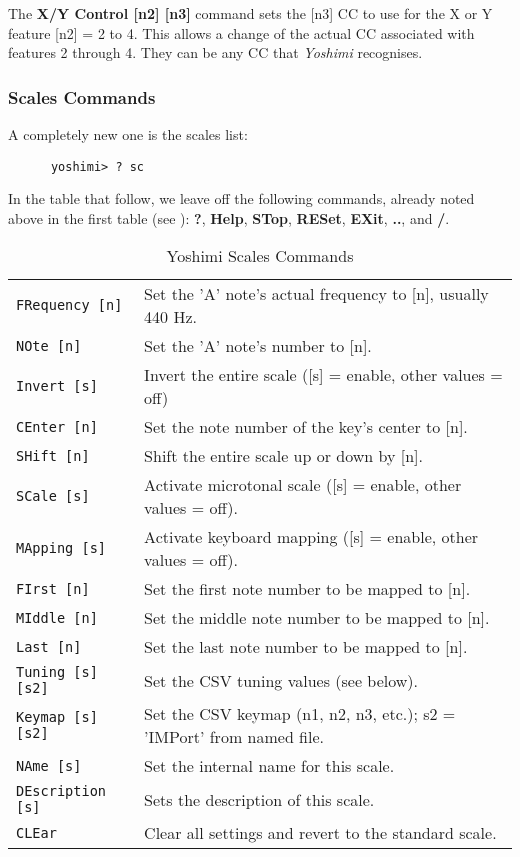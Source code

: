    The \textbf{X/Y Control [n2] [n3]} command
   sets the [n3] CC to use for the X or Y feature [n2] = 2 to 4.
   This allows a change of the actual CC associated with features 2 through 4.
   They can be any CC that \textsl{Yoshimi} recognises.

\subsubsection{Scales Commands}
\label{subsec:command_line_scales_command_list}

   A completely new one is the scales list:

   \begin{verbatim}
      yoshimi> ? sc
   \end{verbatim}

   In the table that follow, we leave off the following commands, already noted
   above in the first table
   (see ):
   \textbf{?}, \textbf{Help}, \textbf{STop}, \textbf{RESet},
   \textbf{EXit}, \textbf{..}, and \textbf{/}.

   \begin{table}[H]
      \centering
      \caption{Yoshimi Scales Commands}
      \label{table:yoshimi_text_scales_commands}
      \begin{tabular}{l l}

\texttt{FRequency [n]} &
   Set the 'A' note's actual frequency to [n], usually 440 Hz. \\
\texttt{NOte [n]} &
   Set the 'A' note's number to [n]. \\
\texttt{Invert [s]} &
   Invert the entire scale ([s] = enable, other values = off) \\
\texttt{CEnter [n]} &
   Set the note number of the key's center to [n]. \\
\texttt{SHift [n]} &
   Shift the entire scale up or down by [n]. \\
\texttt{SCale [s]} &
   Activate microtonal scale ([s] = enable, other values = off). \\
\texttt{MApping [s]} &
   Activate keyboard mapping ([s] = enable, other values = off). \\
\texttt{FIrst [n]} &
   Set the first note number to be mapped to [n]. \\
\texttt{MIddle [n]} &
   Set the middle note number to be mapped to [n]. \\
\texttt{Last [n]} &
   Set the last note number to be mapped to [n]. \\
\texttt{Tuning [s] [s2]} &
   Set the CSV tuning values (see below). \\
\texttt{Keymap [s] [s2]} &
   Set the CSV keymap (n1, n2, n3, etc.); s2 = 'IMPort' from named file. \\
\texttt{NAme [s]} &
   Set the internal name for this scale. \\
\texttt{DEscription [s]} &
   Sets the description of this scale. \\
\texttt{CLEar} &
   Clear all settings and revert to the standard scale. \\

      \end{tabular}
   \end{table}

